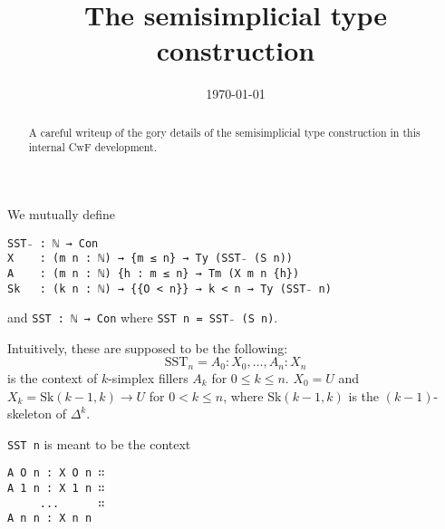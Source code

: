 \documentclass[notitlepage]{scrartcl}
\title{The semisimplicial type construction}
\author{}
\date{\vspace{-5ex}\today}
\newcommand{\code}{\texttt}
\newcommand{\SST}{\mathrm{SST}}
\newcommand{\Sk}{\mathrm{Sk}}
\begin{document}
\maketitle
\begin{abstract}
A careful writeup of the gory details of the semisimplicial type construction in this internal CwF development.
\end{abstract}

We mutually define

\begin{verbatim}
SST₋ : ℕ → Con
X    : (m n : ℕ) → {m ≤ n} → Ty (SST₋ (S n))
A    : (m n : ℕ) {h : m ≤ n} → Tm (X m n {h})
Sk   : (k n : ℕ) → {{O < n}} → k < n → Ty (SST₋ n)
\end{verbatim}

and \code{SST : ℕ → Con} where \code{SST n = SST₋ (S n)}.

Intuitively, these are supposed to be the following:
$$\SST_n = A_0 \colon X_0, \dotsc, A_n \colon X_n$$
is the context of $k$-simplex fillers $A_k$ for $0 \leq k \leq n$.
$X_0 = U$ and $X_k = \Sk(k-1, k) \rightarrow U$ for $0 < k \leq n$, where $\Sk(k-1, k)$ is the $(k-1)$-skeleton of $\Delta^k$.

\code{SST n} is meant to be the context
\begin{verbatim}
A O n : X O n ∷
A 1 n : X 1 n ∷
     ...      ∷
A n n : X n n
\end{verbatim}
\end{document}
